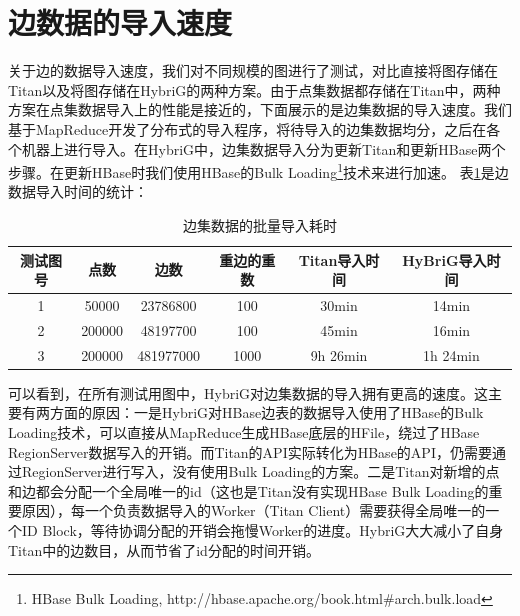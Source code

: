 \section{边数据的导入速度}
关于边的数据导入速度，我们对不同规模的图进行了测试，对比直接将图存储在Titan以及将图存储在HybriG的两种方案。由于点集数据都存储在Titan中，两种方案在点集数据导入上的性能是接近的，下面展示的是边集数据的导入速度。我们基于MapReduce\supercite{mapreduce}开发了分布式的导入程序，将待导入的边集数据均分，之后在各个机器上进行导入。在HybriG中，边集数据导入分为更新Titan和更新HBase两个步骤。在更新HBase时我们使用HBase的Bulk Loading\footnote{HBase Bulk Loading, http://hbase.apache.org/book.html\#arch.bulk.load}技术来进行加速。
表\ref{edge_load_perf}是边数据导入时间的统计：
\begin{table}[!hbp]
\begin{tabular}{|c|c|c|c|c|c|}
\hline
测试图号 & 点数 & 边数 & 重边的重数 & Titan导入时间 & HyBriG导入时间\\
\hline
1 & 50000 & 23786800 & 100 & 30min & 14min\\
\hline
2 & 200000 & 48197700 & 100 & 45min & 16min\\
\hline
3 & 200000 & 481977000 & 1000 & 9h 26min & 1h 24min\\
\hline
\end{tabular}
\caption{边集数据的批量导入耗时}
\label{edge_load_perf}
\end{table}

可以看到，在所有测试用图中，HybriG对边集数据的导入拥有更高的速度。这主要有两方面的原因：一是HybriG对HBase边表的数据导入使用了HBase的Bulk Loading技术，可以直接从MapReduce生成HBase底层的HFile，绕过了HBase RegionServer数据写入的开销。而Titan的API实际转化为HBase的API，仍需要通过RegionServer进行写入，没有使用Bulk Loading的方案。二是Titan对新增的点和边都会分配一个全局唯一的id（这也是Titan没有实现HBase Bulk Loading的重要原因），每一个负责数据导入的Worker（Titan Client）需要获得全局唯一的一个ID Block，等待协调分配的开销会拖慢Worker的进度。HybriG大大减小了自身Titan中的边数目，从而节省了id分配的时间开销。





